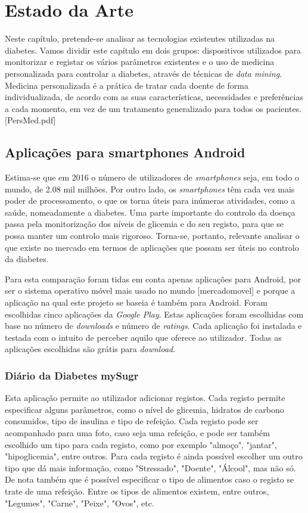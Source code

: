 \chapter{Estado da Arte}\label{chap:stat}

Neste capítulo, pretende-se analisar as tecnologias existentes utilizadas na diabetes. Vamos dividir este capítulo em dois grupos: dispositivos utilizados para monitorizar e registar os vários parâmetros existentes e o uso de medicina personalizada para controlar a diabetes, através de técnicas de \textit{data mining}. Medicina personalizada é a prática de tratar cada doente de forma individualizada, de acordo com as suas características, necessidades e preferências a cada momento, em vez de um tratamento generalizado para todos os pacientes.  [PersMed.pdf]



\section{Aplicações para smartphones Android}

Estima-se que em 2016 o número de utilizadores de \textit{smartphones} seja, em todo o mundo, de 2.08 mil milhões. Por outro lado, os \textit{smartphones} têm cada vez mais poder de processamento, o que os torna úteis para inúmeras atividades, como a saúde, nomeadamente a diabetes. Uma parte importante do controlo da doença passa pela monitorização dos níveis de glicemia e do seu registo, para que se possa manter um controlo mais rigoroso. Torna-se, portanto, relevante analisar o que existe no mercado em termos de aplicações que possam ser úteis no controlo da diabetes.

Para esta comparação foram tidas em conta apenas aplicações para Android, por ser o sistema operativo móvel mais usado no mundo [mercadomovel] e porque a aplicação na qual este projeto se baseia é também para Android. Foram escolhidas cinco aplicações da \textit{Google Play}. Estas aplicações foram escolhidas com base no número de \textit{downloads} e número de \textit{ratings}. Cada aplicação foi instalada e testada com o intuito de perceber aquilo que oferece ao utilizador. Todas as aplicações escolhidas são grátis para \textit{download}.


\subsection{Diário da Diabetes mySugr}

Esta aplicação permite ao utilizador adicionar registos. Cada registo permite especificar alguns parâmetros, como o nível de glicemia, hidratos de carbono consumidos, tipo de insulina e tipo de refeição. Cada registo pode ser acompanhado para uma foto, caso seja uma refeição, e pode ser também escolhido um tipo para cada registo, como por exemplo "almoço", "jantar", "hipoglicemia", entre outros. Para cada registo é ainda possível escolher um outro tipo que dá mais informação, como "Stressado", "Doente", "Álcool", mas não só. De nota também que é possível especificar o tipo de alimentos caso o registo se trate de uma refeição. Entre os tipos de alimentos existem, entre outros, "Legumes", "Carne", "Peixe", "Ovos", etc.

